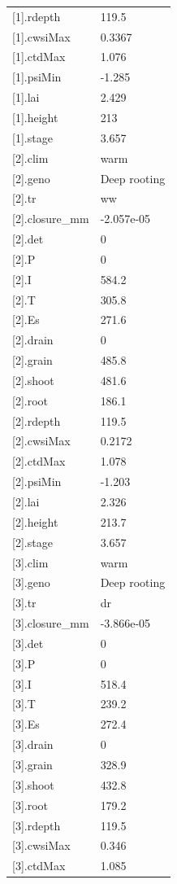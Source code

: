 {\begin{longtable}{p{}p{}}
{}[1].rdepth & 119.5\\
{}[1].cwsiMax & 0.3367\\
{}[1].ctdMax & 1.076\\
{}[1].psiMin & -1.285\\
{}[1].lai & 2.429\\
{}[1].height & 213\\
{}[1].stage & 3.657\\
{}[2].clim & warm\\
{}[2].geno & Deep rooting\\
{}[2].tr & ww\\
{}[2].closure\_mm & -2.057e-05\\
{}[2].det & 0\\
{}[2].P & 0\\
{}[2].I & 584.2\\
{}[2].T & 305.8\\
{}[2].Es & 271.6\\
{}[2].drain & 0\\
{}[2].grain & 485.8\\
{}[2].shoot & 481.6\\
{}[2].root & 186.1\\
{}[2].rdepth & 119.5\\
{}[2].cwsiMax & 0.2172\\
{}[2].ctdMax & 1.078\\
{}[2].psiMin & -1.203\\
{}[2].lai & 2.326\\
{}[2].height & 213.7\\
{}[2].stage & 3.657\\
{}[3].clim & warm\\
{}[3].geno & Deep rooting\\
{}[3].tr & dr\\
{}[3].closure\_mm & -3.866e-05\\
{}[3].det & 0\\
{}[3].P & 0\\
{}[3].I & 518.4\\
{}[3].T & 239.2\\
{}[3].Es & 272.4\\
{}[3].drain & 0\\
{}[3].grain & 328.9\\
{}[3].shoot & 432.8\\
{}[3].root & 179.2\\
{}[3].rdepth & 119.5\\
{}[3].cwsiMax & 0.346\\
{}[3].ctdMax & 1.085\\

\end{longtable}}
